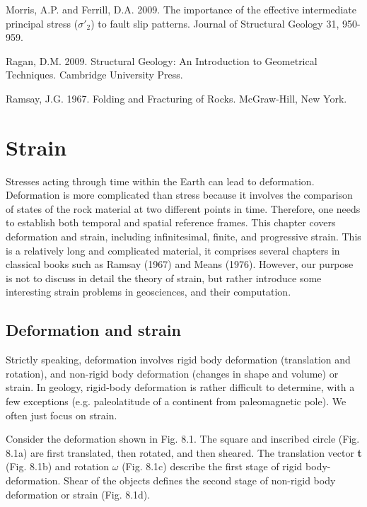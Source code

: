 \documentclass[a4paper , 12pt]{book}
\begin{document}
Morris, A.P. and Ferrill, D.A. 2009. The importance of the effective intermediate principal stress ($\sigma'_2$) to fault slip patterns. Journal of Structural Geology 31, 950-959.

Ragan, D.M. 2009. Structural Geology: An Introduction to Geometrical Techniques. Cambridge University Press.

Ramsay, J.G. 1967. Folding and Fracturing of Rocks. McGraw-Hill, New York.

\chapter{Strain}

Stresses acting through time within the Earth can lead to deformation. Deformation is more complicated than stress because it involves the comparison of states of the rock material at two different points in time. Therefore, one needs to establish both temporal and spatial reference frames. This chapter covers deformation and strain, including infinitesimal, finite, and progressive strain. This is a relatively long and complicated material, it comprises several chapters in classical books such as Ramsay (1967) and Means (1976). However, our purpose is not to discuss in detail the theory of strain, but rather introduce some interesting strain problems in geosciences, and their computation.

\section{Deformation and strain}

Strictly speaking, deformation involves rigid body deformation (translation and rotation), and non-rigid body deformation (changes in shape and volume) or strain. In geology, rigid-body deformation is rather difficult to determine, with a few exceptions (e.g. paleolatitude of a continent from paleomagnetic pole). We often just focus on strain.

Consider the deformation shown in Fig. 8.1. The square and inscribed circle (Fig. 8.1a) are first translated, then rotated, and then sheared. The translation vector \textbf{t} (Fig. 8.1b) and rotation $\omega$ (Fig. 8.1c) describe the first stage of rigid body-deformation. Shear of the objects defines the second stage of non-rigid body deformation or strain (Fig. 8.1d). 
\end{document}
